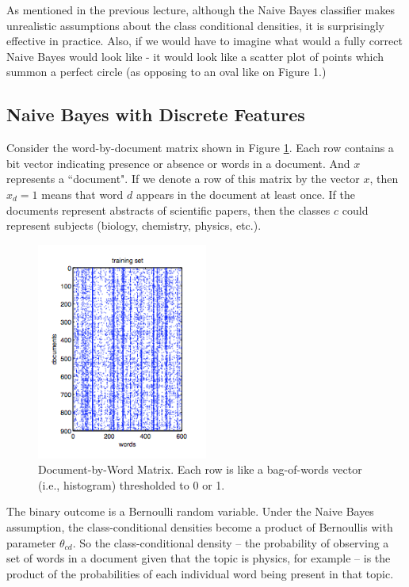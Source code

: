 \documentclass[a4paper]{article}
\begin{document}
As mentioned in the previous lecture, although the Naive Bayes classifier makes unrealistic assumptions about the class conditional densities, it is surprisingly effective in practice. Also, if we would have to imagine what would a fully correct Naive Bayes would look like - it would look like a scatter plot of points which summon a perfect circle (as opposing to an oval like on Figure 1.)

\subsection{Naive Bayes with Discrete Features}
Consider the word-by-document matrix shown in Figure \ref{fig:wordbydocument}.  Each row contains a bit vector indicating presence or absence or words in a document. And $x$ represents a ``document".  If we denote a row of this matrix by the vector $x$, then $x_d=1$ means that word $d$ appears in the document at least once.  If the documents represent abstracts of scientific papers, then the classes $c$ could represent subjects (biology, chemistry, physics, etc.).

\begin{figure}
\centering
\includegraphics[width=0.5\textwidth]{fig3_murphy.png}
\caption{\label{fig:wordbydocument}Document-by-Word Matrix.  Each row is like a bag-of-words vector (i.e., histogram) thresholded to 0 or 1.}
\end{figure}

The binary outcome is a Bernoulli random variable.  Under the Naive Bayes assumption, the class-conditional densities become a product of Bernoullis with parameter $\theta_{cd}$.  So the class-conditional density -- the probability of observing a set of words in a document given that the topic is physics, for example -- is the product of the probabilities of each individual word being present in that topic.
\end{document}

